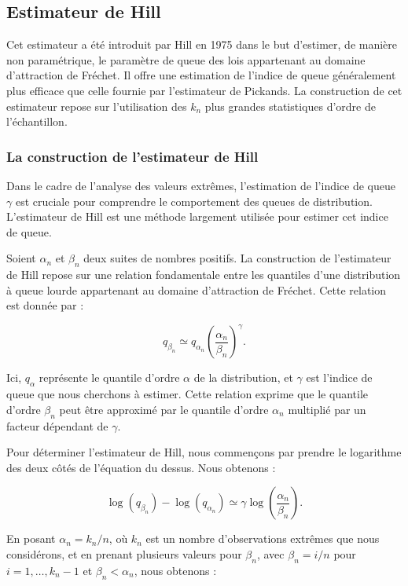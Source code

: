 \documentclass{article}
\theoremstyle{plain}
\theoremstyle{definition}
\theoremstyle{plain}
\begin{document}
\subsection{Estimateur de Hill}
Cet estimateur a été introduit par Hill en 1975 dans le but d’estimer, de manière non paramétrique, le paramètre de queue des lois appartenant au domaine d’attraction de Fréchet. Il offre une estimation de l’indice de queue généralement plus efficace que celle fournie par l’estimateur de Pickands. La construction de cet estimateur repose sur l’utilisation des $k_n$ plus grandes statistiques d’ordre de l’échantillon.



\subsubsection{La construction de l’estimateur de Hill}
Dans le cadre de l'analyse des valeurs extrêmes, l'estimation de l'indice de queue \(\gamma\) est cruciale pour comprendre le comportement des queues de distribution. L'estimateur de Hill est une méthode largement utilisée pour estimer cet indice de queue.

Soient \(\alpha_n\) et \(\beta_n\) deux suites de nombres positifs. La construction de l'estimateur de Hill repose sur une relation fondamentale entre les quantiles d’une distribution à queue lourde appartenant au domaine d’attraction de Fréchet. Cette relation est donnée par :

\[
    q_{\beta_n} \simeq q_{\alpha_n} \left( \frac{\alpha_n}{\beta_n} \right)^{\gamma}.
\]

Ici, \(q_{\alpha}\) représente le quantile d'ordre \(\alpha\) de la distribution, et \(\gamma\) est l'indice de queue que nous cherchons à estimer. Cette relation exprime que le quantile d'ordre \(\beta_n\) peut être approximé par le quantile d'ordre \(\alpha_n\) multiplié par un facteur dépendant de \(\gamma\).

Pour déterminer l'estimateur de Hill, nous commençons par prendre le logarithme des deux côtés de l'équation du dessus. Nous obtenons :

\[
\log(q_{\beta_n}) - \log(q_{\alpha_n}) \simeq \gamma \log\left( \frac{\alpha_n}{\beta_n} \right).
\]

En posant $\alpha_n = k_n/n$, où \(k_n\) est un nombre d'observations extrêmes que nous considérons, et en prenant plusieurs valeurs pour \(\beta_n\), avec \(\beta_n = i/n\) pour \(i = 1, \ldots, k_n - 1\) et \(\beta_n < \alpha_n\), nous obtenons :
\end{document}
